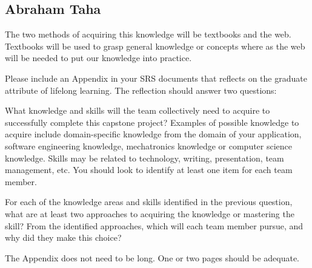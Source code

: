 \documentclass[12pt]{article}
\begin{document}
\subsection*{Abraham Taha}



The two methods of acquiring this knowledge will be textbooks and the web. Textbooks will be used to grasp general knowledge or concepts where as the web will be needed to put our knowledge into practice.


Please include an Appendix in your SRS documents that reflects on the graduate attribute of lifelong learning.  The reflection should answer two questions:

What knowledge and skills will the team collectively need to acquire to successfully complete this capstone project? Examples of possible knowledge to acquire include domain-specific knowledge from the domain of your application, software engineering knowledge, mechatronics knowledge or computer science knowledge. Skills may be related to technology, writing, presentation, team management, etc. You should look to identify at least one item for each team member.

For each of the knowledge areas and skills identified in the previous question, what are at least two approaches to acquiring the knowledge or mastering the skill? From the identified approaches, which will each team member pursue, and why did they make this choice?

The Appendix does not need to be long.  One or two pages should be adequate.
\end{document}
